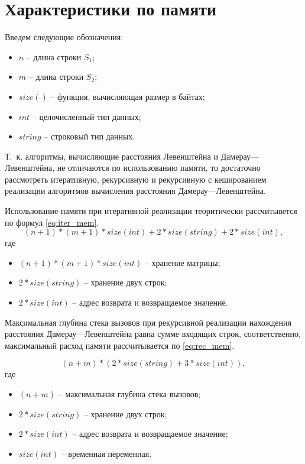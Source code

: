 \section{Характеристики по памяти}

\label{memory}

Введем следующие обозначения:
\begin{itemize}
	\item $n$ -- длина строки $S_1$;
	\item $m$ -- длина строки $S_2$;
	\item $size()$ -- функция, вычисляющая размер в байтах;
	\item $int$ -- целочисленный тип данных;
	\item $string$ -- строковый тип данных.
\end{itemize}

Т.~к. алгоритмы, вычисляющие расстояния Левенштейна и Дамерау---Левенштейна, не отличаются по использованию памяти, то достаточно рассмотреть итеративную, рекурсивную и рекурсивную с кешированием реализации алгоритмов вычисления расстояния Дамерау---Левенштейна.


Использование памяти при итеративной реализации теоритически рассчитывется по формул \eqref{eq:iter_mem}.
\begin{equation}
	\label{eq:iter_mem}
	(n + 1) * (m + 1) * size(int) + 2 * size(string) + 2 * size(int),
\end{equation}
где 
\begin{itemize}
	\item $ (n + 1) * (m + 1) * size(int) $ -- хранение матрицы;
	\item $ 2 * size(string) $ -- хранение двух строк;
	\item $ 2 * size(int) $ -- адрес возврата и возвращаемое значение.
\end{itemize}


Максимальная глубина стека вызовов при рекурсивной реализации
нахождения расстояния Дамерау---Левенштейна равна сумме входящих строк,
соответственно, максимальный расход памяти рассчитывается по \eqref{eq:rec_mem}.

\begin{equation}
	\label{eq:rec_mem}
	(n + m) * (2 * size(string) + 3 * size(int)),
\end{equation}
где 
\begin{itemize}
	\item $ (n + m) $ -- максимальная глубина стека вызовов;
	\item $ 2 * size(string) $ -- хранение двух строк;
	\item $ 2 * size(int) $ -- адрес возврата и возвращаемое значение;
	\item $ size(int) $ -- временная переменная.
\end{itemize}

